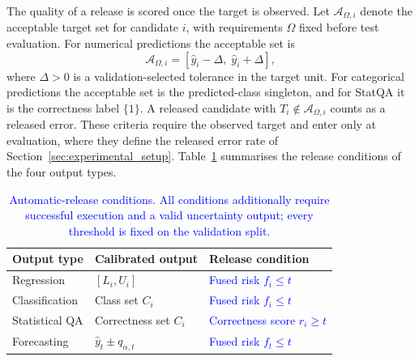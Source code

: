 \documentclass[preprint,12pt,authoryear]{elsarticle}
\begin{document}
{\color{blue}
The quality of a release is scored once the target is observed.
Let \(\mathcal{A}_{\Omega,i}\) denote the acceptable target set for
candidate \(i\), with requirements \(\Omega\) fixed before test
evaluation. For numerical predictions the acceptable set is
\begin{equation}
    \mathcal{A}_{\Omega,i}
    =
    \left[
        \widehat y_i-\Delta,\;
        \widehat y_i+\Delta
    \right],
    \label{eq:numerical_acceptance_set}
\end{equation}
where \(\Delta>0\) is a validation-selected tolerance in the
target unit. For categorical predictions the acceptable set is
the predicted-class singleton, and for StatQA it is the
correctness label \(\{1\}\). A released candidate with
\(T_i\notin\mathcal{A}_{\Omega,i}\) counts as a released error.
These criteria require the observed target and enter only at
evaluation, where they define the released error rate of
Section~\ref{sec:experimental_setup}.
Table~\ref{tab:calibrated_release_conditions} summarises the
release conditions of the four output types.}

\begin{table}[t]
    \centering
    \caption{\textcolor{blue}{Automatic-release conditions. All conditions additionally require successful execution and a valid uncertainty output; every threshold is fixed on the validation split.}}
    \label{tab:calibrated_release_conditions}
    \small
    \renewcommand{\arraystretch}{1.2}
    \begin{tabular}{@{}lll@{}}
        \toprule
        \textbf{Output type}
        & \textbf{Calibrated output}
        & \textbf{Release condition} \\
        \midrule

        Regression
        & \([L_i,U_i]\)
        & \textcolor{blue}{Fused risk \(f_i\leq t\)} \\

        Classification
        & Class set \(C_i\)
        & \textcolor{blue}{Fused risk \(f_i\leq t\)} \\

        Statistical QA
        & Correctness set \(C_i\)
        & \textcolor{blue}{Correctness score \(r_i\geq t\)} \\

        Forecasting
        & \(\widehat y_t\pm q_{\alpha,t}\)
        & \textcolor{blue}{Fused risk \(f_t\leq t\)} \\

        \bottomrule
    \end{tabular}
\end{table}
\end{document}
